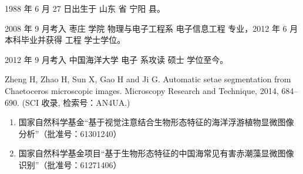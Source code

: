 \begin{resume}


  1988 年 6 月 27 日出生于 山东 省 宁阳 县。
  
  2008 年 9 月考入 枣庄 学院 物理与电子工程系 电子信息工程 专业，2012 年 6 月本科毕业并获得 工程 学士学位。
  
  2012 年 9 月考入 中国海洋大学 电子 系攻读 硕士 学位至今。

     
  \begin{enumerate}[{[}1{]}]
  \item Zheng H, Zhao H, Sun X, Gao H and Ji G. Automatic setae segmentation from
Chaetoceros microscopic images. Microscopy Research and Technique, 2014, 684–690. (SCI 收录, 检索号：AN4UA.)
  \end{enumerate}

  \begin{enumerate}
  \item 国家自然科学基金“基于视觉注意结合生物形态特征的海洋浮游植物显微图像分析”（批准号：61301240）
  \item 国家自然科学基金项目“基于生物形态特征的中国海常见有害赤潮藻显微图像识别”（批准号：61271406）
  \end{enumerate}
  
\end{resume}
